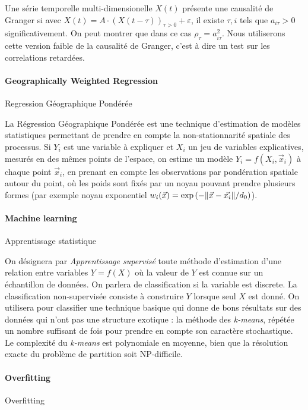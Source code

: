 Une série temporelle multi-dimensionelle $X(t)$ présente une causalité de Granger si avec $X(t) = A\cdot \left(X(t-\tau)\right)_{\tau >0} + \varepsilon$, il existe $\tau,i$ tels que $a_{i\tau}>0$ significativement. On peut montrer que dans ce cas $\rho_{\tau}=a_{i\tau}^2$. Nous utiliserons cette version faible de la causalité de Granger, c'est à dire un test sur les correlations retardées.




\paragraph{Geographically Weighted Regression}{Regression Géographique Pondérée}


La Régression Géographique Pondérée est une technique d'estimation de modèles statistiques permettant de prendre en compte la non-stationnarité spatiale des processus. Si $Y_i$ est une variable à expliquer et $X_i$ un jeu de variables explicatives, mesurés en des mêmes points de l'espace, on estime un modèle $Y_i = f(X_i,\vec{x}_i)$ à chaque point $\vec{x}_i$, en prenant en compte les observations par pondération spatiale autour du point, où les poids sont fixés par un noyau pouvant prendre plusieurs formes (par exemple noyau exponentiel $w_i(\vec{x}) = \exp\left(- \| \vec{x} - \vec{x_i} \| / d_0\right)$).




\paragraph{Machine learning}{Apprentissage statistique}


On désignera par \emph{Apprentissage supervisé} toute méthode d'estimation d'une relation entre variables $Y=f(X)$ où la valeur de $Y$ est connue sur un échantillon de données. On parlera de classification si la variable est discrete. La classification non-supervisée consiste à construire $Y$ lorsque seul $X$ est donné. On utilisera pour classifier une technique basique qui donne de bons résultats sur des données qui n'ont pas une structure exotique : la méthode des \emph{k-means}, répétée un nombre suffisant de fois pour prendre en compte son caractère stochastique. Le complexité du \emph{k-means} est polynomiale en moyenne, bien que la résolution exacte du problème de partition soit NP-difficile.




\paragraph{Overfitting}{Overfitting}

